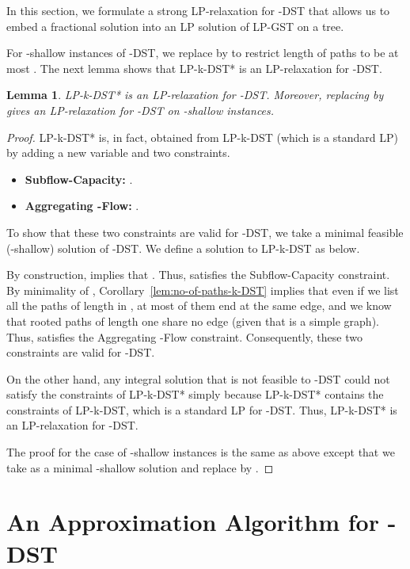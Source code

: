 \documentclass[11pt]{article}
\newtheorem{lemma}[theorem]{Lemma}
\theoremstyle{definition}
\theoremstyle{remark}
\begin{document}
In this section, we formulate a strong LP-relaxation for -DST that
allows us to embed a fractional solution into an LP solution of LP-GST
on a tree. 



For -shallow instances of -DST, we replace  by 
to restrict length of paths to be at most . 
The next lemma shows that LP-k-DST* is an LP-relaxation for -DST.

\begin{lemma} \label{lem:valid-LP-k-DST*}
LP-k-DST* is an LP-relaxation for -DST.
Moreover, replacing  by  gives an LP-relaxation for -DST on
-shallow instances.
\end{lemma}

\begin{proof}
LP-k-DST* is, in fact, obtained from LP-k-DST (which is a standard LP)
by adding a new variable  and two constraints.
\begin{itemize}
\item[(1)] {\bf Subflow-Capacity:}
  .
\item[(2)]{\bf Aggregating -Flow:}
  .
\end{itemize}

To show that these two constraints are valid for -DST,
we take a minimal feasible (-shallow) solution
 of -DST.
We define a solution  to LP-k-DST as below.

By construction,  implies that .
Thus,  satisfies the Subflow-Capacity constraint.
By minimality of , Corollary~\ref{lem:no-of-paths-k-DST} 
implies that even if we list all the paths of length  in
, at most  of them end at the same edge, and we know
that rooted paths of length one share no edge 
(given that  is a simple graph).
Thus,  satisfies the Aggregating -Flow constraint.
Consequently, these two constraints are valid for -DST.

On the other hand, any integral solution that is not feasible to
-DST could not satisfy the constraints of LP-k-DST* simply
because LP-k-DST* contains the constraints of LP-k-DST, which is a
standard LP for -DST.
Thus, LP-k-DST* is an LP-relaxation for -DST.

The proof for the case of -shallow instances is the same as above  
except that we take  as a minimal -shallow solution
and replace  by . 
\end{proof}


\section{An Approximation Algorithm for -DST}
\label{sec:algo-kDST}
\end{document}
